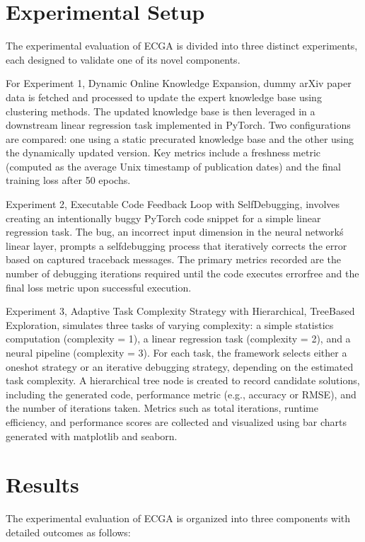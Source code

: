 \documentclass{article} %
\begin{document}
\section{Experimental Setup}
\label{sec:experimental}
The experimental evaluation of ECGA is divided into three distinct experiments, each designed to validate one of its novel components.

For Experiment 1, Dynamic Online Knowledge Expansion, dummy arXiv paper data is fetched and processed to update the expert knowledge base using clustering methods. The updated knowledge base is then leveraged in a downstream linear regression task implemented in PyTorch\citep{Zhai2016}. Two configurations are compared: one using a static pre\-curated knowledge base and the other using the dynamically updated version. Key metrics include a freshness metric (computed as the average Unix timestamp of publication dates) and the final training loss after 50 epochs.

Experiment 2, Executable Code Feedback Loop with Self\-Debugging, involves creating an intentionally buggy PyTorch code snippet for a simple linear regression task. The bug, an incorrect input dimension in the neural network\'s linear layer, prompts a self\-debugging process that iteratively corrects the error based on captured traceback messages. The primary metrics recorded are the number of debugging iterations required until the code executes error\-free and the final loss metric upon successful execution.

Experiment 3, Adaptive Task Complexity Strategy with Hierarchical, Tree\-Based Exploration, simulates three tasks of varying complexity: a simple statistics computation (complexity = 1), a linear regression task (complexity = 2), and a neural pipeline (complexity = 3). For each task, the framework selects either a one\-shot strategy or an iterative debugging strategy, depending on the estimated task complexity. A hierarchical tree node is created to record candidate solutions, including the generated code, performance metric (e.g., accuracy or RMSE), and the number of iterations taken. Metrics such as total iterations, runtime efficiency, and performance scores are collected and visualized using bar charts generated with matplotlib\citep{PastorSatorras2015} and seaborn\citep{Pham2020}.

\section{Results}
\label{sec:results}
The experimental evaluation of ECGA is organized into three components with detailed outcomes as follows:
\end{document}
